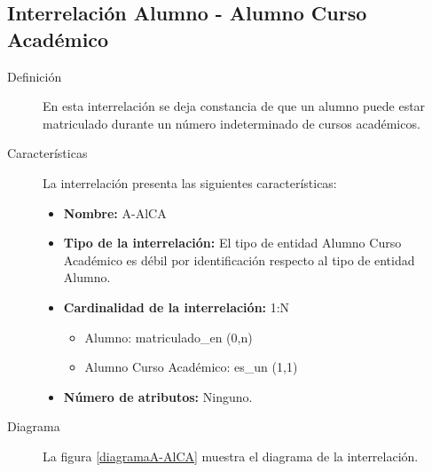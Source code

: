 \subsection{Interrelación Alumno - Alumno Curso Académico}

   \begin{description}
      \item[Definición] En esta interrelación se deja constancia de que un
      alumno puede estar matriculado durante un número indeterminado de cursos
      académicos.

      \item[Características] La interrelación presenta las siguientes
                             características:

         \begin{itemize}
            \item \textbf{Nombre:} A-AlCA
            \item \textbf{Tipo de la interrelación:} El tipo de entidad
                  Alumno Curso Académico es débil por identificación respecto al
                  tipo de entidad Alumno.
            \item \textbf{Cardinalidad de la interrelación:} 1:N
                  \begin{itemize}
                     \item Alumno: matriculado\_en (0,n)
                     \item Alumno Curso Académico: es\_un (1,1)
                  \end{itemize}
            \item \textbf{Número de atributos:} Ninguno.
         \end{itemize}

      \item[Diagrama] La figura \ref{diagramaA-AlCA} muestra el diagrama de la
                      interrelación.


\end{description}
